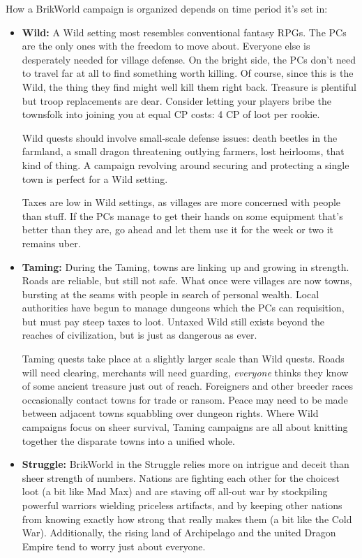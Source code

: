 \documentclass[12pt,a4paper,twocolumn]{article}
\begin{document}
How a BrikWorld campaign is organized depends on time period it's set in:
\begin{itemize}
\item {\bf Wild:} A Wild setting most resembles conventional fantasy RPGs.  The PCs are the only ones with the freedom to move about.  Everyone else is desperately needed for village defense.  On the bright side, the PCs don't need to travel far at all to find something worth killing.  Of course, since this is the Wild, the thing they find might well kill them right back.  Treasure is plentiful but troop replacements are dear.  Consider letting your players bribe the townsfolk into joining you at equal CP costs: 4 CP of loot per rookie.  

Wild quests should involve small-scale defense issues: death beetles in the farmland, a small dragon threatening outlying farmers, lost heirlooms, that kind of thing.  A campaign revolving around securing and protecting a single town is perfect for a Wild setting.

Taxes are low in Wild settings, as villages are more concerned with people than stuff.  If the PCs manage to get their hands on some equipment that's better than they are, go ahead and let them use it for the week or two it remains uber.  

\item {\bf Taming:} During the Taming, towns are linking up and growing in strength.  Roads are reliable, but still not safe.  What once were villages are now towns, bursting at the seams with people in search of personal wealth.  Local authorities have begun to manage dungeons which the PCs can requisition, but must pay steep taxes to loot. Untaxed Wild still exists beyond the reaches of civilization, but is just as dangerous as ever.  

Taming quests take place at a slightly larger scale than Wild quests.  Roads will need clearing, merchants will need guarding, {\it everyone} thinks they know of some ancient treasure just out of reach.  Foreigners and other breeder races occasionally contact towns for trade or ransom.  Peace may need to be made between adjacent towns squabbling over dungeon rights.  Where Wild campaigns focus on sheer survival, Taming campaigns are all about knitting together the disparate towns into a unified whole.

\item {\bf Struggle:} BrikWorld in the Struggle relies more on intrigue and deceit than sheer strength of numbers.  Nations are fighting each other for the choicest loot (a bit like Mad Max) and are staving off all-out war by stockpiling powerful warriors wielding priceless artifacts, and by keeping other nations from knowing exactly how strong that really makes them (a bit like the Cold War).  Additionally, the rising land of Archipelago and the united Dragon Empire tend to worry just about everyone.


\end{itemize}
\end{document}
